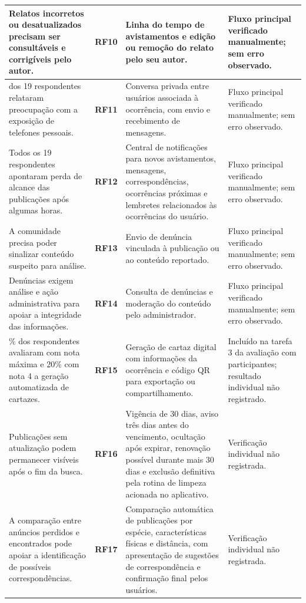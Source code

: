 {\begin{longtable}{|>{\raggedright\arraybackslash}p{4.1cm}|>{\centering\arraybackslash}p{1.4cm}|>{\raggedright\arraybackslash}p{5.8cm}|>{\raggedright\arraybackslash}p{2.7cm}|}
Relatos incorretos ou desatualizados precisam ser consultáveis e corrigíveis pelo autor. & \textbf{RF10} & Linha do tempo de avistamentos e edição ou remoção do relato pelo seu autor. & Fluxo principal verificado manualmente; sem erro observado. \\ \hline
14 dos 19 respondentes relataram preocupação com a exposição de telefones pessoais. & \textbf{RF11} & Conversa privada entre usuários associada à ocorrência, com envio e recebimento de mensagens. & Fluxo principal verificado manualmente; sem erro observado. \\ \hline
Todos os 19 respondentes apontaram perda de alcance das publicações após algumas horas. & \textbf{RF12} & Central de notificações para novos avistamentos, mensagens, correspondências, ocorrências próximas e lembretes relacionados às ocorrências do usuário. & Fluxo principal verificado manualmente; sem erro observado. \\ \hline
A comunidade precisa poder sinalizar conteúdo suspeito para análise. & \textbf{RF13} & Envio de denúncia vinculada à publicação ou ao conteúdo reportado. & Fluxo principal verificado manualmente; sem erro observado. \\ \hline
Denúncias exigem análise e ação administrativa para apoiar a integridade das informações. & \textbf{RF14} & Consulta de denúncias e moderação do conteúdo pelo administrador. & Fluxo principal verificado manualmente; sem erro observado. \\ \hline
80\% dos respondentes avaliaram com nota máxima e 20\% com nota 4 a geração automatizada de cartazes. & \textbf{RF15} & Geração de cartaz digital com informações da ocorrência e código QR para exportação ou compartilhamento. & Incluído na tarefa 3 da avaliação com participantes; resultado individual não registrado. \\ \hline
Publicações sem atualização podem permanecer visíveis após o fim da busca. & \textbf{RF16} & Vigência de 30 dias, aviso três dias antes do vencimento, ocultação após expirar, renovação possível durante mais 30 dias e exclusão definitiva pela rotina de limpeza acionada no aplicativo. & Verificação individual não registrada. \\ \hline
A comparação entre anúncios perdidos e encontrados pode apoiar a identificação de possíveis correspondências. & \textbf{RF17} & Comparação automática de publicações por espécie, características físicas e distância, com apresentação de sugestões de correspondência e confirmação final pelos usuários. & Verificação individual não registrada. \\ \hline
\end{longtable}
}

\clearpage